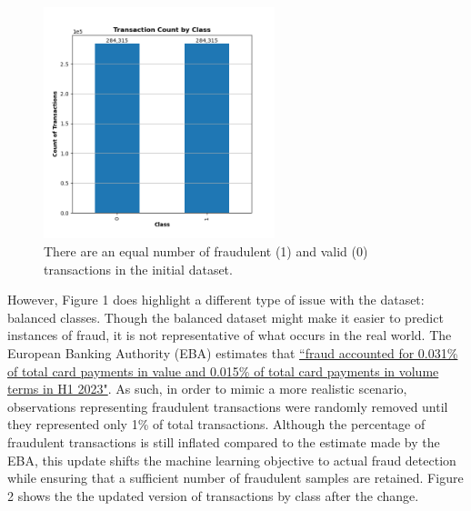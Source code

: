 \documentclass[11pt, oneside]{article}   	%
\begin{document}
\begin{figure}[h!]
    \centering
    \includegraphics[width=0.6\textwidth]{figures/fig_1.png}
    \captionsetup{font=small} 
    \caption{There are an equal number of fraudulent (1) and valid (0) transactions in the initial dataset.}
    \label{fig1}
\end{figure}


\noindent\hspace{10mm}However, Figure 1 does highlight a different type of issue with the dataset: balanced classes. Though the balanced dataset might make it easier to predict instances of fraud, it is not representative of what occurs in the real world. The European Banking Authority (EBA) estimates that \href{https://www.eba.europa.eu/sites/default/files/2024-08/465e3044-4773-4e9d-8ca8-b1cd031295fc/EBA_ECB\%202024\%20Report\%20on\%20Payment\%20Fraud.pdf}{``fraud accounted for 0.031\% of total card payments in value and 0.015\% of total card payments in volume terms in H1 2023"}. As such, in order to mimic a more realistic scenario, observations representing fraudulent transactions were randomly removed until they represented only 1\% of total transactions. Although the percentage of fraudulent transactions is still inflated compared to the estimate made by the EBA, this update shifts the machine learning objective to actual fraud detection while ensuring that a sufficient number of fraudulent samples are retained. Figure 2 shows the the updated version of transactions by class after the change.\\
\end{document}
